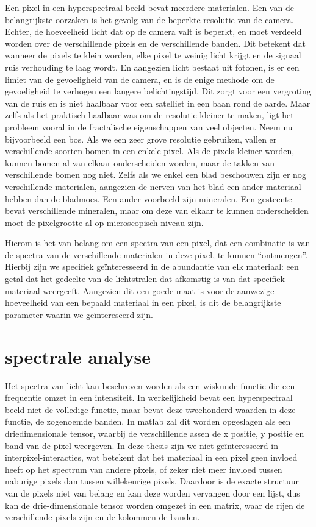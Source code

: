 \documentclass[12pt]{report}
\begin{document}
Een pixel in een hyperspectraal beeld bevat meerdere materialen. Een van de belangrijkste oorzaken is het gevolg van de beperkte resolutie van de camera. Echter, de hoeveelheid licht dat op de camera valt is beperkt, en moet verdeeld worden over de verschillende pixels en de verschillende banden. Dit betekent dat wanneer de pixels te klein worden, elke pixel te weinig licht krijgt en de signaal ruis verhouding te laag wordt. En aangezien licht bestaat uit fotonen, is er een limiet van de gevoeligheid van de camera, en is de enige methode om de gevoeligheid te verhogen een langere belichtingstijd. Dit zorgt voor een vergroting van de ruis en is niet haalbaar voor een satelliet in een baan rond de aarde. Maar zelfs als het praktisch haalbaar was om de resolutie kleiner te maken, ligt het probleem vooral in de fractalische eigenschappen van veel objecten. Neem nu bijvoorbeeld een bos. Als we een zeer grove resolutie gebruiken, vallen er verschillende soorten bomen in een enkele pixel. Als de pixels kleiner worden, kunnen bomen al van elkaar onderscheiden worden, maar de takken van verschillende bomen nog niet. Zelfs als we enkel een blad beschouwen zijn er nog verschillende materialen, aangezien de nerven van het blad een ander materiaal hebben dan de bladmoes. Een ander voorbeeld zijn mineralen. Een gesteente bevat verschillende mineralen, maar om deze van elkaar te kunnen onderscheiden moet de pixelgrootte al op microscopisch niveau zijn. 

Hierom is het van belang om een spectra van een pixel, dat een combinatie is van de spectra van de verschillende materialen in deze pixel, te kunnen ``ontmengen''. Hierbij zijn we specifiek ge\"interesseerd in de abundantie van elk materiaal: een getal dat het gedeelte van de lichtstralen dat afkomstig is van dat specifiek materiaal weergeeft. Aangezien dit een goede maat is voor de aanwezige hoeveelheid van een bepaald materiaal in een pixel, is dit de belangrijkste parameter waarin we ge\"intereseerd zijn.


\section{spectrale analyse}


Het spectra van licht kan beschreven worden als een wiskunde functie die een frequentie omzet in een intensiteit. In werkelijkheid bevat een hyperspectraal beeld niet de volledige functie, maar bevat deze tweehonderd waarden in deze functie, de zogenoemde banden. In matlab\citep{MATLAB} zal dit worden opgeslagen als een driedimensionale tensor, waarbij de verschillende assen de x positie, y positie en band van de pixel weergeven. In deze thesis zijn we niet ge\"interesseerd in  interpixel-interacties, wat betekent dat het materiaal in een pixel geen invloed heeft op het spectrum van andere pixels, of zeker niet meer invloed tussen naburige pixels dan tussen willekeurige pixels. Daardoor is de exacte structuur van de pixels niet van belang en kan deze worden vervangen door een lijst, dus kan de drie-dimensionale tensor worden omgezet in een matrix, waar de rijen de verschillende pixels zijn en de kolommen de banden.  
\end{document}

